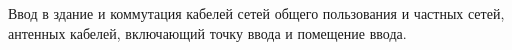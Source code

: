 Ввод в здание и коммутация кабелей сетей общего пользования
и частных сетей, антенных кабелей, включающий точку ввода
и помещение ввода.